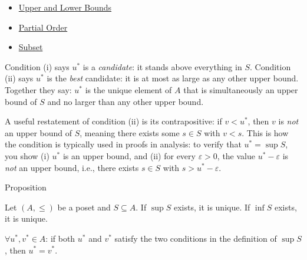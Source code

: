 \begin{dependencies}
\begin{itemize}
  \item \hyperref[def:bounds]{Upper and Lower Bounds}
  \item \hyperref[def:partial-order]{Partial Order}
  \item \hyperref[def:subset]{Subset}
\end{itemize}
\end{dependencies}

\begin{remark*}
\label{rem:sup-reading}
Condition (i) says $u^*$ is a \emph{candidate}: it stands above everything in
$S$. Condition (ii) says $u^*$ is the \emph{best} candidate: it is at most as
large as any other upper bound.  Together they say: $u^*$ is the unique
element of $A$ that is simultaneously an upper bound of $S$ and no larger than
any other upper bound.

A useful restatement of condition (ii) is its contrapositive: if $v < u^*$,
then $v$ is \emph{not} an upper bound of $S$, meaning there exists some
$s \in S$ with $v < s$.  This is how the condition is typically used in
proofs in analysis: to verify that $u^* = \sup S$, you show (i) $u^*$
is an upper bound, and (ii) for every $\varepsilon > 0$, the value
$u^* - \varepsilon$ is \emph{not} an upper bound, i.e., there exists
$s \in S$ with $s > u^* - \varepsilon$.
\end{remark*}


\begin{propositionbox}{Proposition}
\begin{proposition}
\label{prop:sup-unique}
Let $(A, \leq)$ be a poset and $S \subseteq A$.  If $\sup S$ exists, it is
unique.  If $\inf S$ exists, it is unique.
\end{proposition}
\end{propositionbox}

\begin{remark*}
$\forall u^*, v^* \in A$: if both $u^*$ and $v^*$ satisfy the two conditions
in the definition of $\sup S$, then $u^* = v^*$.
\end{remark*}

